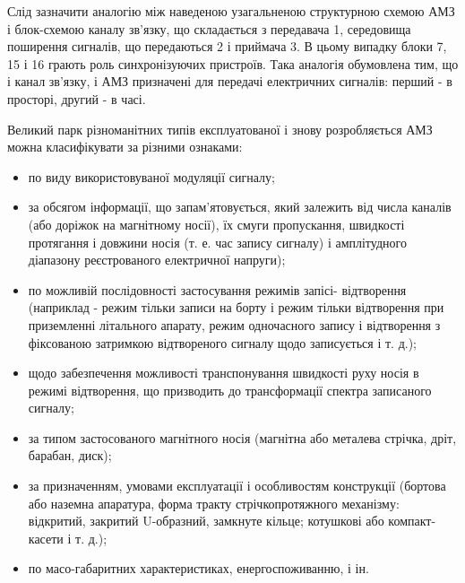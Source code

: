 \documentclass[a4paper,14pt]{extreport}
\begin{document}
  Слід зазначити аналогію між наведеною узагальненою структурною схемою АМЗ і блок-схемою каналу зв'язку, що складається з передавача 1, середовища поширення сигналів, що передаються 2 і приймача 3.
  В цьому випадку блоки 7, 15 і 16 грають роль синхронізуючих пристроїв. Така аналогія обумовлена тим, що і канал зв'язку, і АМЗ призначені для передачі електричних сигналів: перший - в просторі, другий - в часі.\par

  Великий парк різноманітних типів експлуатованої і знову розробляється АМЗ можна класифікувати за різними ознаками:
  \begin{itemize}
    \item по виду використовуваної модуляції сигналу;
    \item за обсягом інформації, що запам'ятовується, який залежить від числа
    каналів (або доріжок на магнітному носії), їх смуги пропускання,
    швидкості протягання і довжини носія (т. е. час запису сигналу) і
    амплітудного діапазону реєстрованого електричної напруги);
    \item по можливій послідовності застосування режимів запісі-
    відтворення (наприклад - режим тільки записи на борту і режим
    тільки відтворення при приземленні літального апарату, режим
    одночасного запису і відтворення з фіксованою затримкою
    відтвореного сигналу щодо записується і т. д.);
    \item щодо забезпечення можливості транспонування швидкості руху
    носія в режимі відтворення, що призводить до трансформації
    спектра записаного сигналу;
    \item за типом застосованого магнітного носія (магнітна або металева стрічка, дріт, барабан, диск);
    \item за призначенням, умовами експлуатації і особливостям конструкції (бортова або наземна апаратура, форма тракту стрічкопротяжного
    механізму: відкритий, закритий U-образний, замкнуте кільце; котушкові або компакт-касети і т. д.);
    \item по масо-габаритних характеристиках, енергоспоживанню, і ін.
  \end{itemize}
\end{document}
